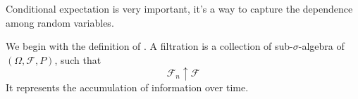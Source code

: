 Conditional expectation is very important, it's a way to capture the dependence among random variables.

We begin with the definition of . A filtration is a collection of sub-\(\sigma\)-algebra of \((\Omega, \mathcal{F}, P)\), such that 
\begin{equation*}
    \mathcal{F}_{n} \uparrow \mathcal{F}
\end{equation*}
It represents the accumulation of information over time. 